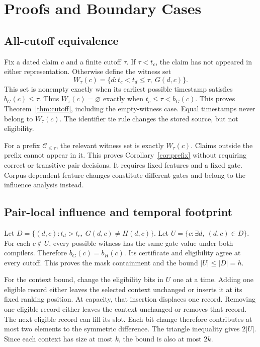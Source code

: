 \section{Proofs and Boundary Cases}
\label{app:proofs}

\subsection{All-cutoff equivalence}

Fix a dated claim $c$ and a finite cutoff $\tau$.
If $\tau<t_c$, the claim has not appeared in either representation.
Otherwise define the witness set
\[
W_\tau(c)=\{d:t_c<t_d\leq\tau,\ G(d,c)\}.
\]
This set is nonempty exactly when its earliest possible timestamp satisfies $b_G(c)\leq\tau$.
Thus $W_\tau(c)=\varnothing$ exactly when $t_c\leq\tau<b_G(c)$.
This proves Theorem~\ref{thm:cutoff}, including the empty-witness case.
Equal timestamps never belong to $W_\tau(c)$.
The identifier tie rule changes the stored source, but not eligibility.

For a prefix $\mathcal C_{\leq\tau}$, the relevant witness set is exactly $W_\tau(c)$.
Claims outside the prefix cannot appear in it.
This proves Corollary~\ref{cor:prefix} without requiring correct or transitive pair decisions.
It requires fixed features and a fixed gate.
Corpus-dependent feature changes constitute different gates and belong to the influence analysis instead.

\subsection{Pair-local influence and temporal footprint}

Let $D=\{(d,c):t_d>t_c,\ G(d,c)\ne H(d,c)\}$.
Let $U=\{c:\exists d,\ (d,c)\in D\}$.
For each $c\notin U$, every possible witness has the same gate value under both compilers.
Therefore $b_G(c)=b_H(c)$.
Its certificate and eligibility agree at every cutoff.
This proves the mask containment and the bound $|U|\leq|D|=h$.

For the context bound, change the eligibility bits in $U$ one at a time.
Adding one eligible record either leaves the selected context unchanged or inserts it at its fixed ranking position.
At capacity, that insertion displaces one record.
Removing one eligible record either leaves the context unchanged or removes that record.
The next eligible record can fill its slot.
Each bit change therefore contributes at most two elements to the symmetric difference.
The triangle inequality gives $2|U|$.
Since each context has size at most $k$, the bound is also at most $2k$.

